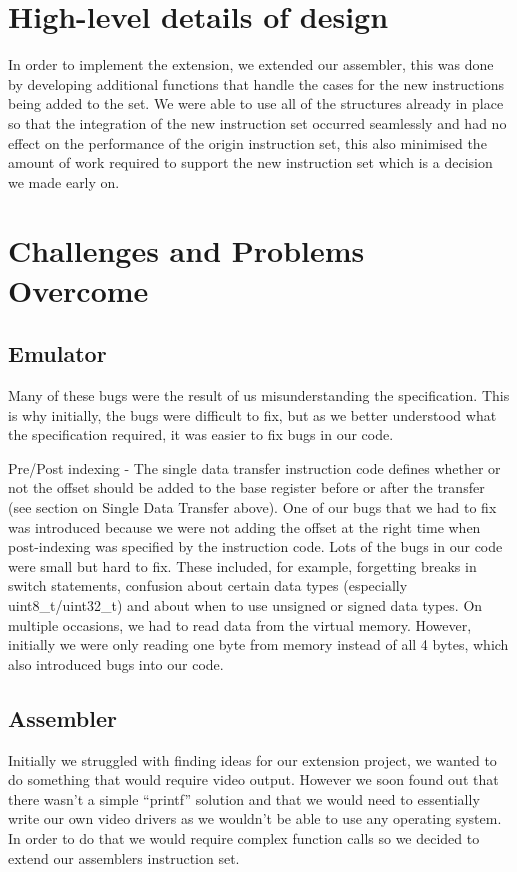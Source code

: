 \documentclass[a4paper]{article}
\begin{document}
\section{High-level details of design}
In order to implement the extension, we extended our assembler, this was done by developing additional functions that handle the cases for the new instructions being added to the set. We were able to use all of the structures already in place so that the integration of the new instruction set occurred seamlessly and had no effect on the performance of the origin instruction set, this also minimised the amount of work required to support the new instruction set which is a decision we made early on. 

\section{Challenges and Problems Overcome}
\subsection{Emulator}
Many of these bugs were the result of us misunderstanding the specification. This is why initially, the bugs were difficult to fix, but as we better understood what the specification required, it was easier to fix bugs in our code.

Pre/Post indexing - The single data transfer instruction code defines whether or not the offset should be added to the base register before or after the transfer (see section on Single Data Transfer above). One of our bugs that we had to fix was introduced because we were not adding the offset at the right time when post-indexing was specified by the instruction code.
Lots of the bugs in our code were small but hard to fix. These included, for example, forgetting breaks in switch statements, confusion about certain data types (especially uint8\_t/uint32\_t) and about when to use unsigned or signed data types.
On multiple occasions, we had to read data from the virtual memory. However, initially we were only reading one byte from memory instead of all 4 bytes, which also introduced bugs into our code.

\subsection{Assembler}
Initially we struggled with finding ideas for our extension project, we wanted to do something that would require video output. However we soon found out that there wasn’t a simple “printf” solution and that we would need to essentially write our own video drivers as we wouldn’t be able to use any operating system. In order to do that we would require complex function calls so we decided to extend our assemblers instruction set.
\end{document}
